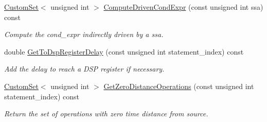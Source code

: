 \begin{DoxyCompactItemize}
\hyperlink{custom__set_8hpp_a615bc2f42fc38a4bb1790d12c759e86f}{Custom\+Set}$<$ unsigned int $>$ \hyperlink{classAllocationInformation_a13b0654b7ba98c1ccb0ca4926778de42}{Compute\+Driven\+Cond\+Expr} (const unsigned int ssa) const
\begin{DoxyCompactList}\small\item\em Compute the cond\+\_\+expr indirectly driven by a ssa. \end{DoxyCompactList}\item 
double \hyperlink{classAllocationInformation_ae54845bcbf9ee4155563a5806420b269}{Get\+To\+Dsp\+Register\+Delay} (const unsigned int statement\+\_\+index) const
\begin{DoxyCompactList}\small\item\em Add the delay to reach a D\+SP register if necessary. \end{DoxyCompactList}\item 
\hyperlink{custom__set_8hpp_a615bc2f42fc38a4bb1790d12c759e86f}{Custom\+Set}$<$ unsigned int $>$ \hyperlink{classAllocationInformation_a4dbe44ffa8fa9b7b986a1d442f3a3867}{Get\+Zero\+Distance\+Operations} (const unsigned int statement\+\_\+index) const
\begin{DoxyCompactList}\small\item\em Return the set of operations with zero time distance from source. \end{DoxyCompactList}\end{DoxyCompactItemize}
